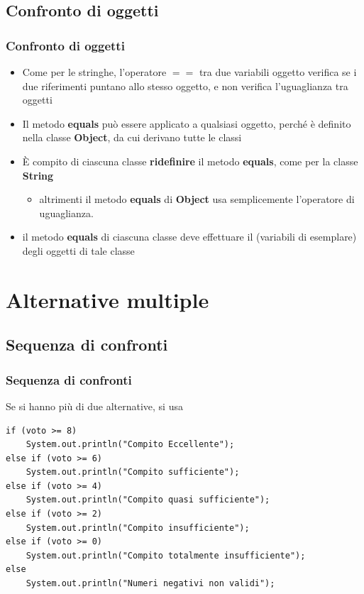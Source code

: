 \subsection*{Confronto di oggetti}
\begin{frame}
\frametitle{Confronto di oggetti}
\begin{block}{}
\begin{itemize}
\item Come per le stringhe, l'operatore $==$ tra due variabili oggetto verifica se i due riferimenti puntano allo stesso oggetto, 
e \alert{non} verifica l'uguaglianza tra oggetti
\item Il metodo \textbf{equals} può essere applicato a qualsiasi oggetto, perché è definito nella classe \textbf{Object}, da cui derivano 
tutte le classi
\item \`E compito di ciascuna classe \textbf{ridefinire} il metodo \textbf{equals}, come per la classe \textbf{String}
\begin{itemize}
\item altrimenti il metodo \textbf{equals} di \textbf{Object} usa semplicemente l'operatore di uguaglianza.
\end{itemize}
\item il metodo \textbf{equals} di ciascuna classe deve effettuare il \textbf{} (variabili 
di esemplare) degli oggetti di tale classe
\end{itemize}
\end{block}
\end{frame}

\section*{Alternative multiple}
\subsection*{Sequenza di confronti}
\begin{frame}[fragile]
\frametitle{Sequenza di confronti}
\begin{block}{}
Se si hanno più di due alternative, si usa \textbf{}
\end{block}
\begin{lstlisting}
if (voto >= 8)
    System.out.println("Compito Eccellente");
else if (voto >= 6)
    System.out.println("Compito sufficiente");
else if (voto >= 4)
    System.out.println("Compito quasi sufficiente");
else if (voto >= 2)
    System.out.println("Compito insufficiente");
else if (voto >= 0)
    System.out.println("Compito totalmente insufficiente");
else
    System.out.println("Numeri negativi non validi");
\end{lstlisting}
\end{frame}

